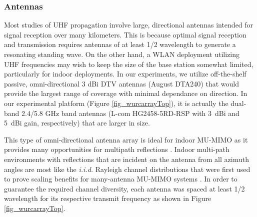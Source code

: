 \subsubsection{Antennas}
	Most studies of UHF propagation involve large, directional antennas intended for signal reception over many kilometers.
	This is because optimal signal reception and transmission requires antennas of at least 1/2 wavelength to generate a resonating standing wave.
	On the other hand, a \ac{WLAN} deployment utilizing UHF frequencies may wish to keep the size of the base station somewhat limited, particularly for indoor deployments.
	In our experiments, we utilize off-the-shelf passive, omni-directional 3 dBi DTV antennas (August DTA240) that would provide the largest range of coverage with minimal dependance on direction.
	In our experimental platform (Figure \ref{fig_wurcarrayTop}), it is actually the dual-band 2.4/5.8 GHz band antennas (L-com HG2458-5RD-RSP with 3~dBi and 5~dBi gain, respectively) that are larger in size.

	This type of omni-directional antenna array is ideal for indoor \ac{MU-MIMO} as it provides many opportunities for multipath reflections \cite{aryafar2010design}.
	Indoor multi-path environments with reflections that are incident on the antenna from all azimuth angles are most like the \textit{i.i.d.} Rayleigh channel distributions that were first used to prove scaling benefits for many-antenna \ac{MU-MIMO} systems \cite{marzetta2010noncooperative}.
	In order to guarantee the required channel diversity, each antenna was spaced at least 1/2 wavelength for its respective transmit frequency as shown in Figure \ref{fig_wurcarrayTop}.

%
%
%
%
%




